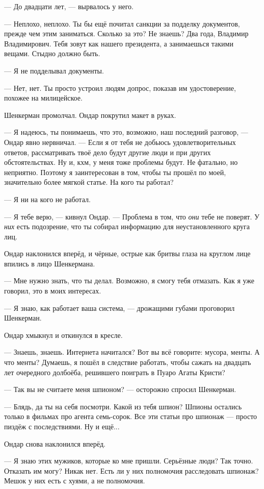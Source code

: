 \documentclass[a4paper,10pt,fleqn]{book}\usepackage{polyglossia}\setdefaultlanguage{english}\setotherlanguage{russian}\defaultfontfeatures{Ligatures=TeX,Mapping=tex-text} \usepackage{xcolor}\definecolor{lightgray}{HTML}{bbbbbb}\color{lightgray}\newcommand{\ml}[3]{\textcolor{black}{#3}}
\begin{document}
--- До двадцати лет, --- вырвалось у него.

--- Неплохо, неплохо.
Ты бы ещё почитал санкции за подделку документов, прежде чем этим заниматься.
Сколько за это?
Не знаешь?
Два года, Владимир Владимирович.
Тебя зовут как нашего президента, а занимаешься такими вещами.
Стыдно должно быть.

--- Я не подделывал документы.

--- Нет, нет.
Ты просто устроил людям допрос, показав им удостоверение, похожее на милицейское.

Шенкерман промолчал.
Ондар покрутил макет в руках.

--- Я надеюсь, ты понимаешь, что это, возможно, наш последний разговор, --- Ондар явно нервничал.
--- Если я от тебя не добьюсь удовлетворительных ответов, рассматривать твоё дело будут другие люди и при других обстоятельствах.
Ну и, кхм, у меня тоже проблемы будут.
Не фатально, но неприятно.
Поэтому я заинтересован в том, чтобы ты прошёл по моей, значительно более мягкой статье.
На кого ты работал?

--- Я ни на кого не работал.

--- Я тебе верю, --- кивнул Ондар.
--- Проблема в том, что \emph{они} тебе не поверят.
У \emph{них} есть подозрение, что ты собирал информацию для неустановленного круга лиц.

Ондар наклонился вперёд, и чёрные, острые как бритвы глаза на круглом лице впились в лицо Шенкермана.

--- Мне нужно знать, что ты делал.
Возможно, я смогу тебя отмазать.
Как я уже говорил, это в моих интересах.

--- Я знаю, как работает ваша система, --- дрожащими губами проговорил Шенкерман.

Ондар хмыкнул и откинулся в кресле.

--- Знаешь, знаешь.
Интернета начитался?
Вот вы всё говорите: мусора, менты.
А что менты?
Думаешь, я пошёл в следствие работать, чтобы сажать на двадцать лет очередного долбоёба, решившего поиграть в Пуаро Агаты Кристи?

--- Так вы не считаете меня шпионом? --- осторожно спросил Шенкерман.

--- Блядь, да ты на себя посмотри.
Какой из тебя шпион?
Шпионы остались только в фильмах про агента семь-сорок.
Все эти статьи про шпионаж --- просто пиздёж с последствиями.
Ну и ещё...

Ондар снова наклонился вперёд.

--- Я знаю этих мужиков, которые ко мне пришли.
Серьёзные люди? 
Так точно.
Отказать им могу?
Никак нет.
Есть ли у них полномочия расследовать шпионаж?
Мешок у них есть с хуями, а не полномочия.
\end{document}
